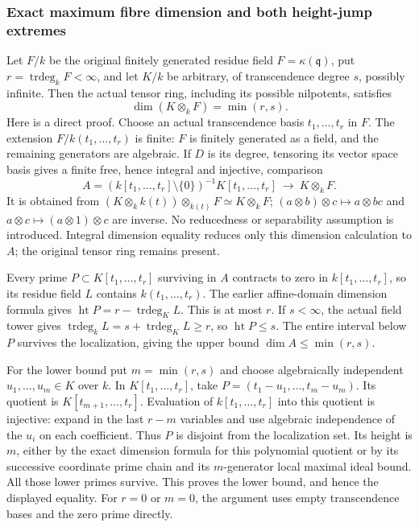 \subsubsection{Exact maximum fibre dimension and both height-jump extremes}\label{algebra-proof-026-exact-maximum-fibre-dimension-and-both-height-jump-extremes}

Let \(F/k\) be the original finitely generated residue field \(F=\kappa(\mathfrak q)\), put \(r=\operatorname{trdeg}_kF<\infty\), and let \(K/k\) be arbitrary, of transcendence degree \(s\), possibly infinite. Then the actual tensor ring, including its possible nilpotents, satisfies \[
 \dim(K\otimes_kF)=\min(r,s).
\] Here is a direct proof. Choose an actual transcendence basis \(t_1,\ldots,t_r\) in \(F\). The extension \(F/k(t_1,\ldots,t_r)\) is finite: \(F\) is finitely generated as a field, and the remaining generators are algebraic. If \(D\) is its degree, tensoring its vector space basis gives a finite free, hence integral and injective, comparison \[
 A=(k[t_1,\ldots,t_r]\setminus\{0\})^{-1}K[t_1,\ldots,t_r]
      \ \longrightarrow\ K\otimes_kF .
\] It is obtained from \((K\otimes_k k(t))\otimes_{k(t)}F\simeq K\otimes_kF\); \((a\otimes b)\otimes c\mapsto a\otimes bc\) and \(a\otimes c\mapsto(a\otimes1)\otimes c\) are inverse. No reducedness or separability assumption is introduced. Integral dimension equality reduces only this dimension calculation to \(A\); the original tensor ring remains present.

Every prime \(P\subset K[t_1,\ldots,t_r]\) surviving in \(A\) contracts to zero in \(k[t_1,\ldots,t_r]\), so its residue field \(L\) contains \(k(t_1,\ldots,t_r)\). The earlier affine-domain dimension formula gives \(\operatorname{ht}P=r-\operatorname{trdeg}_K L\). This is at most \(r\). If \(s<\infty\), the actual field tower gives \(\operatorname{trdeg}_k L=s+\operatorname{trdeg}_K L\geq r\), so \(\operatorname{ht}P\leq s\). The entire interval below \(P\) survives the localization, giving the upper bound \(\dim A\leq\min(r,s)\).

For the lower bound put \(m=\min(r,s)\) and choose algebraically independent \(u_1,\ldots,u_m\in K\) over \(k\). In \(K[t_1,\ldots,t_r]\), take \(P=(t_1-u_1,\ldots,t_m-u_m)\). Its quotient is \(K[t_{m+1},\ldots,t_r]\). Evaluation of \(k[t_1,\ldots,t_r]\) into this quotient is injective: expand in the last \(r-m\) variables and use algebraic independence of the \(u_i\) on each coefficient. Thus \(P\) is disjoint from the localization set. Its height is \(m\), either by the exact dimension formula for this polynomial quotient or by its successive coordinate prime chain and its \(m\)-generator local maximal ideal bound. All those lower primes survive. This proves the lower bound, and hence the displayed equality. For \(r=0\) or \(m=0\), the argument uses empty transcendence bases and the zero prime directly.

